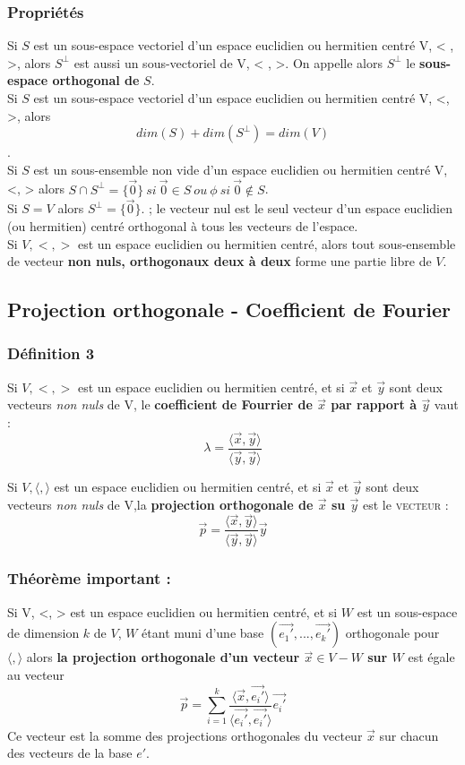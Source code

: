 \documentclass[12pt, a4paper, openany]{article}
\begin{document}
\subsubsection*{Propriétés}
Si $S$ est un sous-espace vectoriel d'un espace euclidien ou hermitien centré V, < , >, alors $S^{\perp}$ est aussi un sous-vectoriel de V, < , >. On appelle alors $S^{\perp}$ le \textbf{sous-espace orthogonal de} $S$.\\

Si $S$ est un sous-espace vectoriel d'un espace euclidien ou hermitien centré V, <, >, alors 
$$dim(S) + dim(S^\perp) = dim(V)$$.\\

Si $S$ est un sous-ensemble non vide d'un espace euclidien ou hermitien centré V, <, > alors $S \cap S^\perp = \{\vec{0}\}\ si\ \vec{0} \in S\ ou\ \phi\ si\ \vec{0} \notin S$.\\

Si $S = V$ alors $S^\perp = \{\vec{0}\}$. ; le vecteur nul est le seul vecteur d'un espace euclidien (ou hermitien) centré orthogonal à tous les vecteurs de l'espace.\\

Si $V, <, >$ est un espace euclidien ou hermitien centré, alors tout sous-ensemble de vecteur \textbf{non nuls, orthogonaux deux à deux} forme une partie libre de $V$.

\subsection{Projection orthogonale - Coefficient de Fourier}
\subsubsection*{Définition 3}
Si $V, < , >$ est un espace euclidien ou hermitien centré, et si $\vec{x}$ et $\vec{y}$ sont deux vecteurs \textit{non nuls} de V, le \textbf{coefficient de Fourrier de $\vec{x}$ par rapport à $\vec{y}$} vaut : 
$$\lambda = \frac{\langle\vec{x}, \vec{y}\rangle}{\langle\vec{y}, \vec{y}\rangle}$$

Si $V, \langle , \rangle$ est un espace euclidien ou hermitien centré, et si $\vec{x}$ et $\vec{y}$ sont deux vecteurs \textit{non nuls} de V,la \textbf{projection orthogonale de $\vec{x}$ su $\vec{y}$} est le \textsc{vecteur} :
$$\vec{p} = \frac{\langle\vec{x}, \vec{y}\rangle}{\langle\vec{y}, \vec{y}\rangle}\vec{y}$$

\subsubsection{Théorème important :}
Si V, <, > est un espace euclidien ou hermitien centré, et si $W$ est un sous-espace de dimension $k$ de $V$, $W$ étant muni d'une base $(\vec{e_1'}, ..., \vec{e_k'})$ orthogonale pour $\langle , \rangle$ alors \textbf{la projection orthogonale d'un vecteur $\vec{x} \in V - W$ sur $W$} est égale au vecteur 
$$\vec{p} = \sum_{i=1}^k \frac{\langle\vec{x}, \vec{e_i'}\rangle}{\langle \vec{e_i'}, \vec{e_i'}\rangle}\vec{e_i'}$$
Ce vecteur est la somme des projections orthogonales du vecteur $\vec{x}$ sur chacun des vecteurs de la base $e'$.\\
\end{document}
